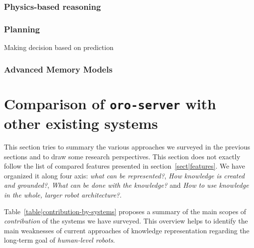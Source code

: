 \subsubsection{Physics-based reasoning}
\subsubsection{Planning}
Making decision based on prediction

\subsubsection{Advanced Memory Models}



\section{Comparison of {\tt oro-server} with other existing systems}
\label{sect|evaluation-oroserver}

This section tries to summary the various approaches we surveyed in the
previous sections and to draw some research perspectives. This section does not
exactly follow the list of compared features presented in
section~\ref{sect|features}. We have organized it along four axis: \emph{what
can be represented?}, \emph{How knowledge is created and grounded?}, \emph{What
can be done with the knowledge?} and \emph{How to use knowledge in the whole,
larger robot architecture?}.

Table~\ref{table|contribution-by-systems} proposes a summary of the main scopes
of \emph{contribution} of the systems we have surveyed. This overview helps to
identify the main weaknesses of current approaches of knowledge representation
regarding the long-term goal of \emph{human-level robots}.


